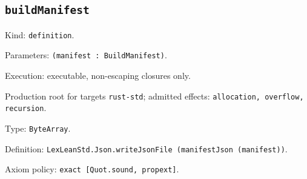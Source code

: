\documentclass[11pt]{article}
\begin{document}
\subsection*{\texttt{buildManifest}}
\noindent Kind: \texttt{definition}.\par
\noindent Parameters: \texttt{(manifest : BuildManifest)}.\par
\noindent Execution: executable, non-escaping closures only.\par
\noindent Production root for targets \texttt{rust-std}; admitted effects: \texttt{allocation, overflow, recursion}.\par
\noindent Type: \texttt{ByteArray}.\par
\noindent Definition: \texttt{LexLeanStd.Json.writeJsonFile (manifestJson (manifest))}.\par
\noindent Axiom policy: \texttt{exact [Quot.sound, propext]}.\par
\end{document}

